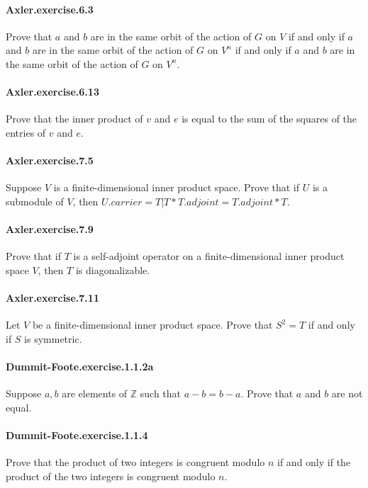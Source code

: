\documentclass{article}
\begin{document}
\paragraph{Axler.exercise.6.3} Prove that $a$ and $b$ are in the same orbit of the action of $G$ on $V$ if and only if $a$ and $b$ are in the same orbit of the action of $G$ on $V^n$ if and only if $a$ and $b$ are in the same orbit of the action of $G$ on $V^n$.

\paragraph{Axler.exercise.6.13} Prove that the inner product of $v$ and $e$ is equal to the sum of the squares of the entries of $v$ and $e$.

\paragraph{Axler.exercise.7.5} Suppose $V$ is a finite-dimensional inner product space. Prove that if $U$ is a submodule of $V$, then $U.carrier = {T | T * T.adjoint = T.adjoint * T}$.

\paragraph{Axler.exercise.7.9} Prove that if $T$ is a self-adjoint operator on a finite-dimensional inner product space $V$, then $T$ is diagonalizable.

\paragraph{Axler.exercise.7.11} Let $V$ be a finite-dimensional inner product space. Prove that $S^2 = T$ if and only if $S$ is symmetric.

\paragraph{Dummit-Foote.exercise.1.1.2a} Suppose $a, b$ are elements of $\mathbb{Z}$ such that $a - b = b - a$. Prove that $a$ and $b$ are not equal.

\paragraph{Dummit-Foote.exercise.1.1.4} Prove that the product of two integers is congruent modulo $n$ if and only if the product of the two integers is congruent modulo $n$.
\end{document}
